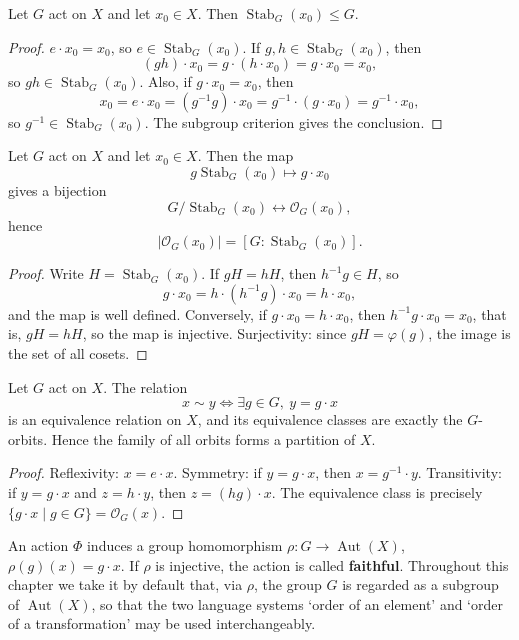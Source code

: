 \begin{proposition}\label{prop:stabilizer_subgroup}
Let $G$ act on $X$ and let $x_0\in X$. Then $\operatorname{Stab}_G(x_0)\le G$.
\end{proposition}

\begin{proof}
$e\cdot x_0=x_0$, so $e\in\operatorname{Stab}_G(x_0)$. If $g,h\in\operatorname{Stab}_G(x_0)$, then
\[
(gh)\cdot x_0=g\cdot(h\cdot x_0)=g\cdot x_0=x_0,
\]
so $gh\in\operatorname{Stab}_G(x_0)$. Also, if $g\cdot x_0=x_0$, then
\[
x_0=e\cdot x_0=(g^{-1}g)\cdot x_0=g^{-1}\cdot(g\cdot x_0)=g^{-1}\cdot x_0,
\]
so $g^{-1}\in\operatorname{Stab}_G(x_0)$. The subgroup criterion gives the conclusion.
\end{proof}

\begin{lemma}\label{lem:orbit_stabilizer}
Let $G$ act on $X$ and let $x_0\in X$. Then the map
\[
g\operatorname{Stab}_G(x_0)\mapsto g\cdot x_0
\]
gives a bijection
\[
G/\operatorname{Stab}_G(x_0)\longleftrightarrow \mathcal{O}_G(x_0),
\]
hence
\[
|\mathcal{O}_G(x_0)|=[G:\operatorname{Stab}_G(x_0)].
\]
\end{lemma}

\begin{proof}
Write $H=\operatorname{Stab}_G(x_0)$. If $gH=hH$, then $h^{-1}g\in H$, so
\[
g\cdot x_0=h\cdot(h^{-1}g)\cdot x_0=h\cdot x_0,
\]
and the map is well defined. Conversely, if $g\cdot x_0=h\cdot x_0$, then $h^{-1}g\cdot x_0=x_0$, that is, $gH=hH$, so the map is injective. Surjectivity: since $gH=\varphi(g)$, the image is the set of all cosets.
\end{proof}

\begin{theorem}\label{thm:orbit_partition}
Let $G$ act on $X$. The relation
\[
x\sim y \iff \exists g\in G,\ y=g\cdot x
\]
is an equivalence relation on $X$, and its equivalence classes are exactly the $G$-orbits. Hence the family of all orbits forms a partition of $X$.
\end{theorem}

\begin{proof}
Reflexivity: $x=e\cdot x$. Symmetry: if $y=g\cdot x$, then $x=g^{-1}\cdot y$. Transitivity: if $y=g\cdot x$ and $z=h\cdot y$, then $z=(hg)\cdot x$. The equivalence class is precisely $\{g\cdot x\mid g\in G\}=\mathcal{O}_G(x)$.
\end{proof}

\begin{remark}\label{rem:faithful}
An action $\Phi$ induces a group homomorphism $\rho:G\to\operatorname{Aut}(X)$, $\rho(g)(x)=g\cdot x$. If $\rho$ is injective, the action is called \textbf{faithful}. Throughout this chapter we take it by default that, via $\rho$, the group $G$ is regarded as a subgroup of $\operatorname{Aut}(X)$, so that the two language systems `order of an element' and `order of a transformation' may be used interchangeably.
\end{remark}


